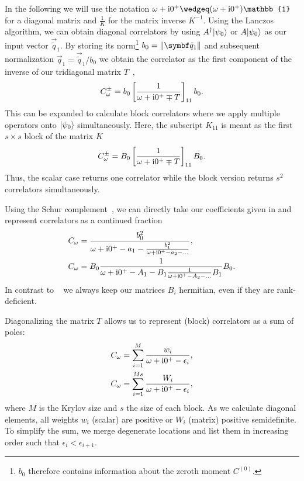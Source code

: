 In the following we will use the notation $\omega + \mi0^+ \wedgeq (\omega + \mi0^+)\mathbb{1}$
for a diagonal matrix and
$\frac{1}{K}$ for the matrix inverse $K^{-1}$.
Using the Lanczos algorithm,
we can obtain diagonal correlators
by using $A^\dag\lvert\psi_0\rangle$ or $A\lvert\psi_0\rangle$ as our input vector $\vec{\tilde q}_1$.
By storing its norm\footnote{
    $b_0$ therefore contains information about the zeroth moment $C^{(0)}$.
}
$b_0 = \norm{\vec{\tilde q}_1}$ and subsequent
normalization $\vec{q}_1 = \vec{\tilde q}_1/b_0$
we obtain the correlator as
the first component of the inverse of our tridiagonal matrix $T$~\cite{Lu2014},
\begin{equation}
    C^\pm_\omega
    =
    b_0 \left[\frac{1}{\omega + \mathrm{i}0^+ \mp T}\right]_{11} b_0.
\end{equation}
This can be expanded to calculate block correlators where we apply multiple
operators onto $\lvert\psi_0\rangle$ simultaneously.
Here, the subscript $K_{11}$ is meant as the first $s\times s$ block of the matrix $K$
\begin{equation}
    C^\pm_\omega
    =
    B_0 \left[\frac{1}{\omega + \mathrm{i}0^+ \mp T}\right]_{11} B_0.
\end{equation}
Thus, the scalar case returns one correlator
while the block version returns $s^2$ correlators simultaneously.

Using the Schur complement~\cite{Schur1917},
we can directly take our coefficients given in 
and represent correlators as a continued fraction
\begin{subequations}
    \begin{align}
        C_\omega
         & =
        \frac{b_0^2}{\omega + \mathrm{i}0^+ - a_1 - \frac{b_1^2}{\omega + \mathrm{i}0^+ - a_2 - \ldots}}, \\
        C_\omega
         & =
        B_0\frac{1}{\omega + \mathrm{i}0^+ - A_1 - B_1\frac{1}{\omega + \mathrm{i}0^+ - A_2 - \ldots}B_1}B_0.
    \end{align}%
\end{subequations}
In contrast to \quanty~\cite{Ackermann2024} we always keep our matrices $B_i$ hermitian,
even if they are rank-deficient.

Diagonalizing the matrix $T$ allows us to represent (block) correlators as a sum of poles:
\begin{subequations}
    \begin{align}
        C_\omega
         & =
        \sum_{i=1}^M \frac{w_i}{\omega + \mathrm{i}0^+ - \epsilon_i}, \\
        C_\omega
         & =
        \sum_{i=1}^{Ms} \frac{W_i}{\omega + \mathrm{i}0^+ - \epsilon_i},
    \end{align}%
    \label{eq:correlator-sum}%
\end{subequations}
where $M$ is the Krylov size and $s$ the size of each block.
As we calculate diagonal elements,
all weights $w_i$ (scalar) are positive or $W_i$ (matrix) positive semidefinite.
To simplify the sum,
we merge degenerate locations and list them in increasing order such that
$\epsilon_{i} < \epsilon_{i+1}$.

